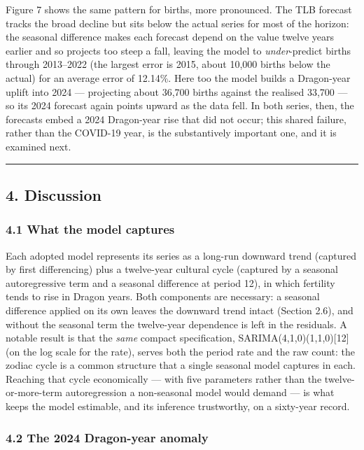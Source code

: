 \documentclass[
  11pt,
]{article}
\begin{document}
Figure 7 shows the same pattern for births, more pronounced. The TLB
forecast tracks the broad decline but sits below the actual series for
most of the horizon: the seasonal difference makes each forecast depend
on the value twelve years earlier and so projects too steep a fall,
leaving the model to \emph{under}-predict births through 2013--2022 (the
largest error is 2015, about 10,000 births below the actual) for an
average error of 12.14\%. Here too the model builds a Dragon-year uplift
into 2024 --- projecting about 36,700 births against the realised 33,700
--- so its 2024 forecast again points upward as the data fell. In both
series, then, the forecasts embed a 2024 Dragon-year rise that did not
occur; this shared failure, rather than the COVID-19 year, is the
substantively important one, and it is examined next.

\begin{center}\rule{0.5\linewidth}{0.5pt}\end{center}

\subsection{4. Discussion}\label{discussion}

\subsubsection{4.1 What the model
captures}\label{what-the-model-captures}

Each adopted model represents its series as a long-run downward trend
(captured by first differencing) plus a twelve-year cultural cycle
(captured by a seasonal autoregressive term and a seasonal difference at
period 12), in which fertility tends to rise in Dragon years. Both
components are necessary: a seasonal difference applied on its own
leaves the downward trend intact (Section 2.6), and without the seasonal
term the twelve-year dependence is left in the residuals. A notable
result is that the \emph{same} compact specification,
SARIMA(4,1,0)(1,1,0){[}12{]} (on the log scale for the rate), serves
both the period rate and the raw count: the zodiac cycle is a common
structure that a single seasonal model captures in each. Reaching that
cycle economically --- with five parameters rather than the
twelve-or-more-term autoregression a non-seasonal model would demand ---
is what keeps the model estimable, and its inference trustworthy, on a
sixty-year record.

\subsubsection{4.2 The 2024 Dragon-year
anomaly}\label{the-2024-dragon-year-anomaly}
\end{document}
